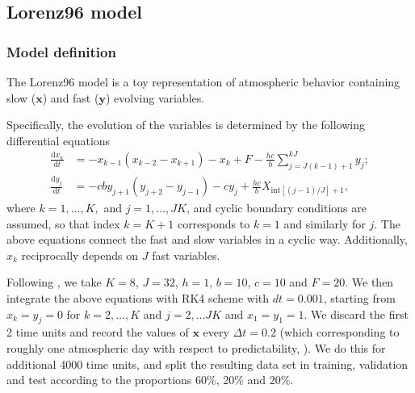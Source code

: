\documentclass[twoside,11pt]{article}
\newcommand{\ddsim}{\mathbf{x}}
\newcommand{\ddobs}{\mathbf{y}}
\begin{document}
	
	
	\subsection{Lorenz96 model}\label{app:Lorenz}
	
	
	\subsubsection{Model definition}\label{app:Lorenz_model}
	
	
	The Lorenz96 model \citep{lorenz1996predictability} is a toy representation of atmospheric behavior containing slow ($ \ddsim $) and fast ($ \ddobs $) evolving variables. 
	
	Specifically, the evolution of the variables is determined by the following differential equations
	\begin{equation*}
	\begin{aligned}
	\frac{\mathrm{d}x_k}{\mathrm{d}t} &= - x_{k-1}(x_{k-2}-x_{k+1}) -x_k + F -\frac{hc}{b} \sum_{j=J(k-1)+1}^{kJ} y_j;\\
	\frac{\mathrm{d}y_j}{\mathrm{d}t} &= - cb y_{j+1}(y_{j+2}-y_{j-1}) -c y_j + \frac{hc}{b} X_{\text{int}[(j-1)/J]+1},
	\end{aligned}
	\end{equation*}	
	where $ k=1, \ldots, K, $ and $ j=1, \ldots, JK$, and cyclic boundary conditions are assumed, so that index $ k=K+1 $ corresponds to $ k=1 $ and similarly for $ j $. The above equations connect the fast and slow variables in a cyclic way. Additionally, $ x_k $ reciprocally depends on $ J $ fast variables.
	
	
	Following \cite{gagne2020machine}, we take $ K = 8 $, $ J=32 $, $ h = 1 $, $ b = 10 $, $ c = 10 $ and $ F = 20 $. We then integrate the above equations with RK4 scheme with $ dt = 0.001 $, starting from $ x_k = y_j=0 $ for $ k=2, \ldots, K $ and $ j=2, \ldots JK $ and $ x_1=y_1=1 $. We discard the first 2 time units and record the values of $ \mathbf x $ every $ \Delta t = 0.2 $ (which corresponding to roughly one atmospheric day with respect to predictability, \citealp{gagne2020machine}). We do this for additional 4000 time units, and split the resulting data set in training, validation and test according to the proportions $ 60\% $, $ 20\% $ and $ 20\% $. 
	
	
	
	
	
	
	
	
	
\end{document}
